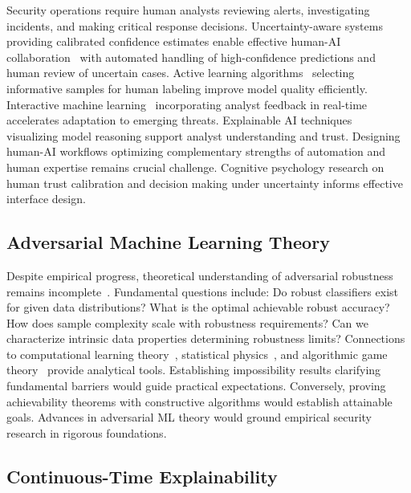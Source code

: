 Security operations require human analysts reviewing alerts, investigating incidents, and making critical response decisions. Uncertainty-aware systems providing calibrated confidence estimates enable effective human-AI collaboration~\cite{bansal2021does} with automated handling of high-confidence predictions and human review of uncertain cases. Active learning algorithms~\cite{settles2009active} selecting informative samples for human labeling improve model quality efficiently. Interactive machine learning~\cite{amershi2014power} incorporating analyst feedback in real-time accelerates adaptation to emerging threats. Explainable AI techniques~\cite{ribeiro2016should,lundberg2017unified} visualizing model reasoning support analyst understanding and trust. Designing human-AI workflows optimizing complementary strengths of automation and human expertise remains crucial challenge. Cognitive psychology research on human trust calibration and decision making under uncertainty informs effective interface design.

\subsection*{Adversarial Machine Learning Theory}

Despite empirical progress, theoretical understanding of adversarial robustness remains incomplete~\cite{schmidt2018adversarially,zhang2019theoretically}. Fundamental questions include: Do robust classifiers exist for given data distributions? What is the optimal achievable robust accuracy? How does sample complexity scale with robustness requirements? Can we characterize intrinsic data properties determining robustness limits? Connections to computational learning theory~\cite{valiant1984theory}, statistical physics~\cite{shalev2014understanding}, and algorithmic game theory~\cite{nisan2007algorithmic} provide analytical tools. Establishing impossibility results clarifying fundamental barriers would guide practical expectations. Conversely, proving achievability theorems with constructive algorithms would establish attainable goals. Advances in adversarial ML theory would ground empirical security research in rigorous foundations.

\subsection*{Continuous-Time Explainability}


